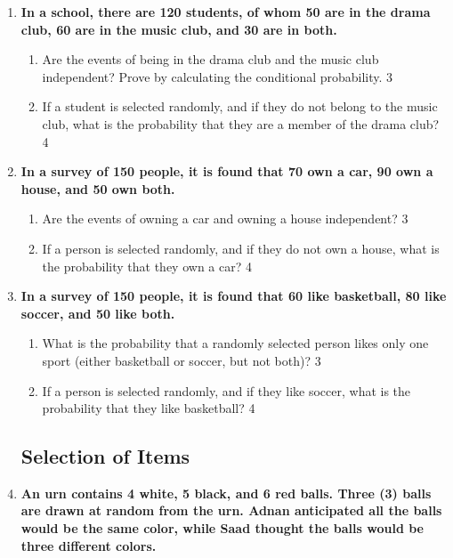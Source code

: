 \documentclass[a4paper,oneside]{book}
\begin{document}
\begin{enumerate}
  \item  
  \textbf{In a school, there are 120 students, of whom 50 are in the drama club, 60 are in the music club, and 30 are in both.}  

  \begin{enumerate}  
    \item  
    	Are the events of being in the drama club and the music club independent? Prove by calculating the conditional probability. \hfill 3  
    \item  
    	If a student is selected randomly, and if they do not belong to the music club, what is the probability that they are a member of the drama club? \hfill 4  
  \end{enumerate}  

\item  
  \textbf{In a survey of 150 people, it is found that 70 own a car, 90 own a house, and 50 own both.}  

  \begin{enumerate}  
    \item  
    	Are the events of owning a car and owning a house independent?  \hfill 3  
    \item  
    	If a person is selected randomly, and if they do not own a house, what is the probability that they own a car? \hfill 4  
  \end{enumerate}  
  
  \item  
  \textbf{In a survey of 150 people, it is found that 60 like basketball, 80 like soccer, and 50 like both.}  

  \begin{enumerate}  
    \item  
    	What is the probability that a randomly selected person likes only one sport (either basketball or soccer, but not both)? \hfill 3  
    \item  
    	If a person is selected randomly, and if they like soccer, what is the probability that they like basketball? \hfill 4  
  \end{enumerate}  


\subsection{Selection of Items}

 \item
	  \textbf{An urn contains 4 white, 5 black, and 6 red balls. Three (3) balls are drawn at random from the urn. Adnan anticipated all the balls would be the same color, while Saad thought the balls would be three different colors.} 
  

\end{enumerate}
\end{document}
